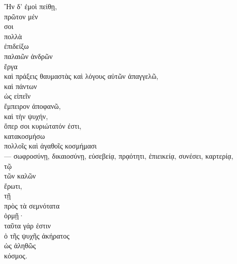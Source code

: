 {\large
\begin{greek}
\noindent  Ἢν δ' ἐμοὶ πείθῃ, \\
\tabto{2em} πρῶτον μέν \\
\tabto{2em} σοι \\
\tabto{2em} πολλὰ \\
\tabto{4em} ἐπιδείξω \\
\tabto{6em} παλαιῶν ἀνδρῶν \\
\tabto{2em} ἔργα \\
\tabto{4em} καὶ πράξεις θαυμαστὰς καὶ λόγους αὐτῶν ἀπαγγελῶ, \\
\tabto{4em} καὶ πάντων \\
\tabto{6em} ὡς εἰπεῖν \\
\tabto{4em} ἔμπειρον ἀποφανῶ, \\
\tabto{4em} καὶ τὴν ψυχήν, \\
\tabto{6em} ὅπερ σοι κυριώτατόν ἐστι, \\
\tabto{4em} κατακοσμήσω \\
\tabto{6em} πολλοῖς καὶ ἀγαθοῖς κοσμήμασι\\
\tabto{6em} — σωφροσύνῃ, δικαιοσύνῃ, εὐσεβείᾳ, πρᾳότητι, ἐπιεικείᾳ, συνέσει, καρτερίᾳ, \\
\tabto{6em} τῷ \\
\tabto{8em} τῶν καλῶν \\
\tabto{6em} ἔρωτι, \\
\tabto{6em} τῇ \\
\tabto{8em} πρὸς τὰ σεμνότατα \\
\tabto{6em} ὁρμῇ· \\
\tabto{8em} ταῦτα γάρ ἐστιν \\
\tabto{10em} ὁ τῆς ψυχῆς ἀκήρατος \\
\tabto{12em} ὡς ἀληθῶς \\
\tabto{10em} κόσμος.\\

\end{greek}
}

